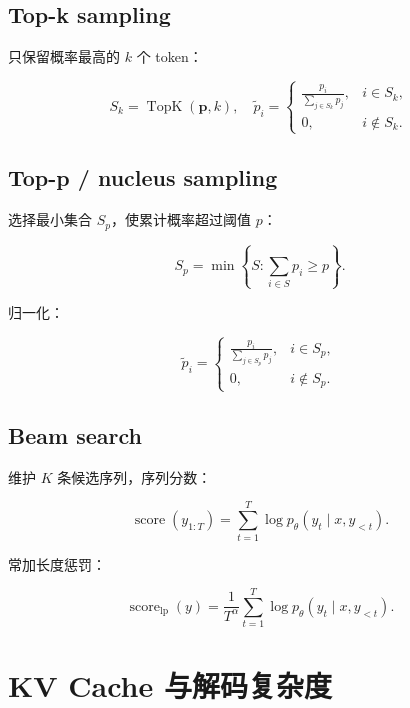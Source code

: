 \documentclass[UTF8,12pt]{ctexart}
\newcommand{\1}{\mathbf{1}}
\newcommand{\TopK}{\operatorname{TopK}}
\begin{document}
\subsection{Top-k sampling}

只保留概率最高的 $k$ 个 token：

\begin{equation}
S_k=\TopK(\bm{p},k),
\quad
\tilde{p}_i=
\begin{cases}
\frac{p_i}{\sum_{j\in S_k}p_j}, & i\in S_k,\\
0, & i\notin S_k.
\end{cases}
\end{equation}

\subsection{Top-p / nucleus sampling}

选择最小集合 $S_p$，使累计概率超过阈值 $p$：

\begin{equation}
S_p=\min\left\{S:
\sum_{i\in S}p_i\ge p
\right\}.
\end{equation}

归一化：

\begin{equation}
\tilde{p}_i=
\begin{cases}
\frac{p_i}{\sum_{j\in S_p}p_j}, & i\in S_p,\\
0, & i\notin S_p.
\end{cases}
\end{equation}

\subsection{Beam search}

维护 $K$ 条候选序列，序列分数：

\begin{equation}
\operatorname{score}(y_{1:T})
=\sum_{t=1}^{T}\log p_\theta(y_t\mid x,y_{<t}).
\end{equation}

常加长度惩罚：

\begin{equation}
\operatorname{score}_{\mathrm{lp}}(y)
=\frac{1}{T^\alpha}
\sum_{t=1}^{T}\log p_\theta(y_t\mid x,y_{<t}).
\end{equation}

\section{KV Cache 与解码复杂度}
\end{document}
